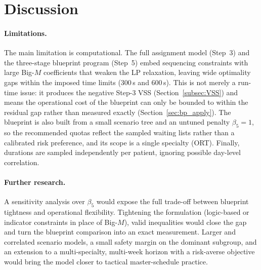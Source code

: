 \section{Discussion}
\label{sec:discussion}

\paragraph{Limitations.}
The main limitation is computational. The full assignment model (Step~3) and the
three-stage blueprint program (Step~5) embed sequencing constraints with large
Big-$M$ coefficients that weaken the LP relaxation, leaving wide optimality gaps
within the imposed time limits (300\,s and 600\,s). This is not merely a run-time
issue: it produces the negative Step-3 VSS
(Section~\ref{subsec:VSS}) and means the operational cost of the blueprint can
only be bounded to within the residual gap rather than measured exactly
(Section~\ref{sec:bp_apply}). The blueprint is also built from a small scenario
tree and an untuned penalty $\beta_5 = 1$, so the recommended quotas reflect the
sampled waiting lists rather than a calibrated risk preference, and its scope is a
single specialty (ORT). Finally, durations are sampled independently per patient,
ignoring possible day-level correlation.

\paragraph{Further research.}
A sensitivity analysis over $\beta_5$ would expose the full trade-off between
blueprint tightness and operational flexibility. Tightening the
formulation (logic-based or indicator constraints in place of Big-$M$), valid
inequalities would close the gap and turn the blueprint comparison into an exact
measurement. Larger and correlated scenario models, a small safety margin on the
dominant subgroup, and an extension to a multi-specialty, multi-week horizon with
a risk-averse objective would bring the model closer to
tactical master-schedule practice.
